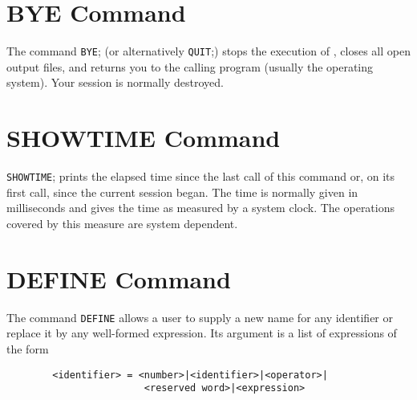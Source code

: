 

\section{BYE Command}

The command {\tt BYE}; (or alternatively {\tt QUIT};)
stops the execution
of {\REDUCE}, closes all open output files, and returns you to the calling
program (usually the operating system).  Your {\REDUCE} session is
normally destroyed.

\section{SHOWTIME Command}

{\tt SHOWTIME}; prints the elapsed time since the last call of this
command or, on its first call, since the current {\REDUCE} session began.
The time is normally given in milliseconds and gives the time as measured
by a system clock.  The operations covered by this measure are system
dependent.

\section{DEFINE Command}

The command {\tt DEFINE} allows a user to supply a new name for
any identifier or replace it by any well-formed expression.  Its argument
is a list of expressions of the form
\begin{verbatim}
        <identifier> = <number>|<identifier>|<operator>|
                        <reserved word>|<expression>
\end{verbatim}

